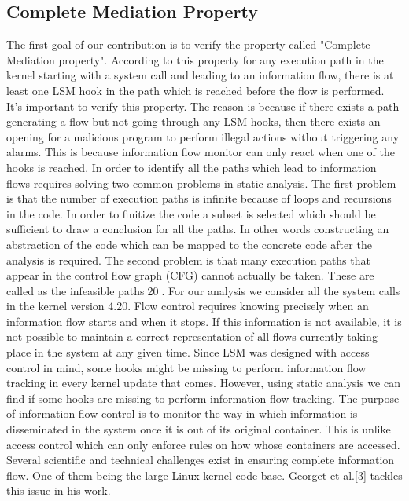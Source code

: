 \subsection{Complete Mediation Property}
The first goal of our contribution is to verify the property called "Complete Mediation property". According to this property for any execution path in the kernel starting with a system call and leading to an information flow, there is at least one LSM hook in the path which is reached before the flow is performed. It's important to verify this property. The reason is because if there exists a path generating a flow but not going through any LSM hooks, then there exists an opening for a malicious program to perform illegal actions without triggering any alarms. This is because information flow monitor can only react when one of the hooks is reached. 
\vskip 0.1in
In order to identify all the paths which lead to information flows requires solving two common problems in static analysis. The first problem is that the number of execution paths is infinite because of loops and recursions in the code. In order to finitize the code a subset is selected which should be sufficient to draw a conclusion for all the paths. In other words constructing an abstraction of the code which can be mapped to the concrete code after the analysis is required. The second problem  is that many execution paths that appear in the control flow graph (CFG) cannot actually be taken. These are called as the infeasible paths[20].  
\vskip 0.1in
For our analysis we consider all the system calls in the kernel version 4.20. Flow control requires knowing precisely when an information flow starts and when it stops. If this information is not available, it is not possible to maintain a correct representation of all flows currently taking place in the system at any given time. Since LSM was designed with access control in mind, some hooks might be missing to perform information flow tracking in every kernel update that comes. However, using static analysis we can find if some hooks are missing to perform information flow tracking. 
\vskip 0.1in
\label{Information flow}
The purpose of information flow control is to monitor the way in which information is disseminated in the system once it is out of its original container. This is unlike access control which can only enforce rules on how whose containers are accessed. Several scientific and technical challenges exist in ensuring complete information flow. One of them being the large Linux kernel code base. Georget et al.[3] tackles this issue in his work.

